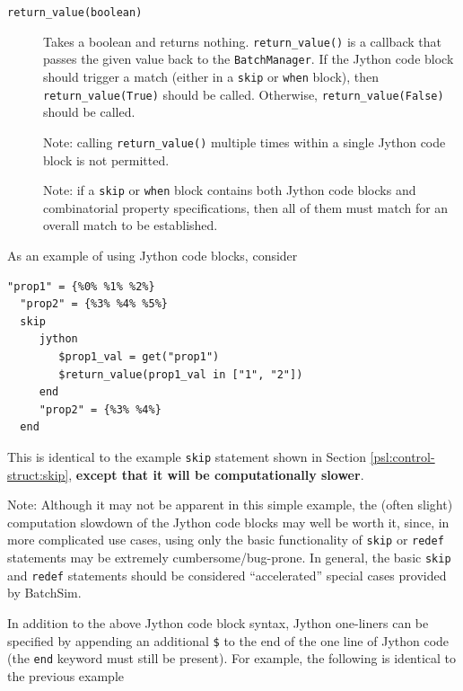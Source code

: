 \documentclass{article}
\newcommand{\BM}{{\tt BatchManager}}
\begin{document}
\begin{description}
\item[{\tt return\_value(boolean)} ] \mbox{}

Takes a boolean and returns nothing. {\tt return\_value()} is a callback that passes the given value back to the \BM. If the Jython code block should trigger a match (either in a {\tt skip} or {\tt when} block), then {\tt return\_value(True)} should be called. Otherwise, {\tt return\_value(False)} should be called.

\begin{sideblock}
Note: calling {\tt return\_value()} multiple times within a single Jython code block is not permitted.
\end{sideblock}

\begin{sideblock}
Note: if a {\tt skip} or {\tt when} block contains both Jython code blocks and combinatorial property specifications, then all of them must match for an overall match to be established.
\end{sideblock}

\end{description}

As an example of using Jython code blocks, consider

\begin{lstlisting}[]
  "prop1" = {%0% %1% %2%}
  "prop2" = {%3% %4% %5%}
  skip
     jython
        $prop1_val = get("prop1")
        $return_value(prop1_val in ["1", "2"])
     end
     "prop2" = {%3% %4%}
  end
\end{lstlisting}

This is identical to the example {\tt skip} statement shown in Section \ref{psl:control-struct:skip}, \textbf{except that it will be computationally slower}.

\begin{sideblock}
Note: Although it may not be apparent in this simple example, the (often slight) computation slowdown of the Jython code blocks may well be worth it, since, in more complicated use cases, using only the basic functionality of {\tt skip} or {\tt redef} statements may be extremely cumbersome/bug-prone. In general, the basic {\tt skip} and {\tt redef} statements should be considered ``accelerated'' special cases provided by BatchSim.
\end{sideblock}

In addition to the above Jython code block syntax, Jython one-liners can be specified by appending an additional {\tt \$} to the end of the one line of Jython code (the {\tt end} keyword must still be present). For example, the following is identical to the previous example
\end{document}

